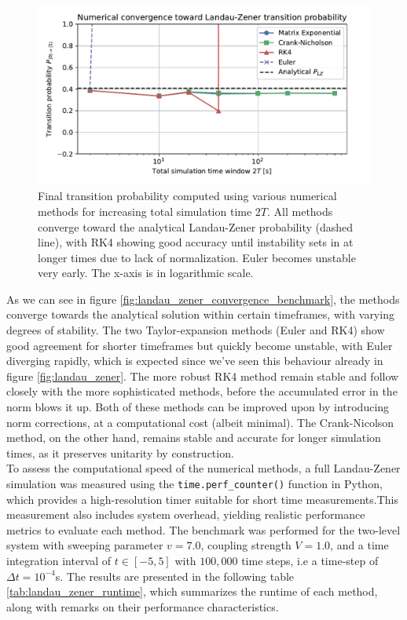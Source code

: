 \documentclass{subfiles}
\begin{document}
\begin{figure}[h!]
\centering
\includegraphics[width=1.0\textwidth]{figs/landau_zener_convergence_benchmark.pdf}
\caption{Final transition probability computed using various numerical methods for increasing total simulation time $
2T$. All methods converge toward the analytical Landau-Zener probability (dashed line), with RK4 showing good accuracy until instability sets in at longer times due to lack of normalization. Euler becomes unstable very early. The x-axis is in logarithmic scale.}
\label{fig:landau_zener_convergence_benchmark}
\end{figure}

As we can see in figure \eqref{fig:landau_zener_convergence_benchmark}, the methods converge towards the analytical solution within certain timeframes, with varying degrees of stability. The two Taylor-expansion methods (Euler and RK4) show good agreement for shorter timeframes but quickly become unstable, with Euler diverging rapidly, which is expected since we've seen this behaviour already in figure \eqref{fig:landau_zener}. The more robust RK4 method remain stable and follow closely with the more sophisticated methods, before the accumulated error in the norm blows it up. Both of these methods can be improved upon by introducing norm corrections, at a computational cost (albeit minimal). The Crank-Nicolson method, on the other hand, remains stable and accurate for longer simulation times, as it preserves unitarity by construction. 
\\ 

To assess the computational speed of the numerical methods, a full Landau-Zener simulation was measured using the \texttt{time.perf\_counter()} function in Python, which provides a high-resolution timer suitable for short time measurements.This measurement also includes system overhead, yielding realistic performance metrics to evaluate each method. 
The benchmark was performed for the two-level system with sweeping parameter $v=7.0$, coupling strength $V=1.0$, and a time integration interval of $t \in [-5, 5]$ with $100{,}000$ time steps, i.e a time-step of $\Delta t = 10^{-4}$s. The results are presented in the following table \eqref{tab:landau_zener_runtime}, which summarizes the runtime of each method, along with remarks on their performance characteristics.
\end{document}
